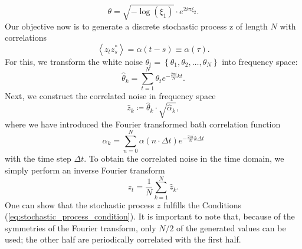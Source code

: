 \begin{equation*}
    \theta = \sqrt{-\log(\xi_1)} \cdot e^{2i\pi\xi_2}.
\end{equation*}
Our objective now is to generate a discrete stochastic process z of length $N$ with correlations
\begin{equation*}
    \left\langle z_t z^*_s\right\rangle = \alpha(t - s) \equiv \alpha(\tau).
\end{equation*}
For this, we transform the white noise $\theta_t = \left\{\theta_1, \theta_2, \dots, \theta_{N}\right\}$ into frequency space:
\begin{equation*}
    \hat{\theta}_k = \sum_{t=1}^{N} \theta_t e^{-\frac{2\pi i}{N}kt}.
\end{equation*}
Next, we construct the correlated noise in frequency space
\begin{equation*}
    \hat{z}_k \coloneqq \hat{\theta}_k \cdot \sqrt{\hat{\alpha}_k},
\end{equation*}
where we have introduced the Fourier transformed bath correlation function
\begin{equation*}
    \hat{\alpha}_k = \sum_{n = 0}^{N} \alpha(n\cdot\Delta t) e^{-\frac{2\pi i}{N} k\Delta t}
\end{equation*}
with the time step $\Delta t$. To obtain the correlated noise in the time domain, we simply perform an inverse Fourier transform
\begin{equation*}
    z_t = \frac{1}{N} \sum_{k = 1}^{N} \hat{z}_k.
\end{equation*}
One can show that the stochastic process $z$ fulfills the Conditions (\ref{eq:stochastic_process_condition}).
It is important to note that, because of the symmetries of the Fourier transform, only $N/2$ of the generated
values can be used; the other half are periodically correlated with the first half. 